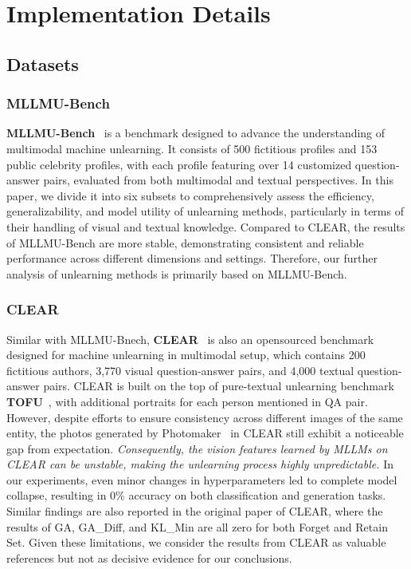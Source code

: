 \section{Implementation Details}
\subsection{Datasets}\label{app:dataset}
\subsubsection{MLLMU-Bench}
\textbf{MLLMU-Bench}~\cite{liu2024mllmubench} is a benchmark designed to advance the understanding of multimodal machine unlearning. It consists of 500 fictitious profiles and 153 public celebrity profiles, with each profile featuring over 14 customized question-answer pairs, evaluated from both multimodal and textual perspectives.  In this paper, we divide it into six subsets to comprehensively assess the efficiency, generalizability, and model utility of unlearning methods, particularly in terms of their handling of visual and textual knowledge. Compared to CLEAR, the results of MLLMU-Bench are more stable, demonstrating consistent and reliable performance across different dimensions and settings. Therefore, our further analysis of unlearning methods is primarily based on MLLMU-Bench.
\subsubsection{CLEAR}
Similar with MLLMU-Bnech, \textbf{CLEAR}~\cite{dontsov2024clear} is also an opensourced benchmark designed for machine unlearning in multimodal setup, which contains 200 fictitious authors, 3,770 visual question-answer pairs, and 4,000 textual question-answer pairs.  CLEAR is built on the top of pure-textual unlearning benchmark \textbf{TOFU}~\cite{maini2024tofu}, with additional portraits for each person mentioned in QA pair. However, despite efforts to ensure consistency across different images of the same entity, the photos generated by Photomaker~\cite{li2024photomaker} in CLEAR still exhibit a noticeable gap from expectation. \emph{Consequently, the vision features learned by MLLMs on CLEAR can be unstable, making the unlearning process highly unpredictable.} In our experiments, even minor changes in hyperparameters led to complete model collapse, resulting in 0\% accuracy on both classification and generation tasks. Similar findings are also reported in the original paper of CLEAR, where the results of GA, GA\_Diff, and KL\_Min are all zero for both Forget and Retain Set. Given these limitations, we consider the results from CLEAR as valuable references but not as decisive evidence for our conclusions.
